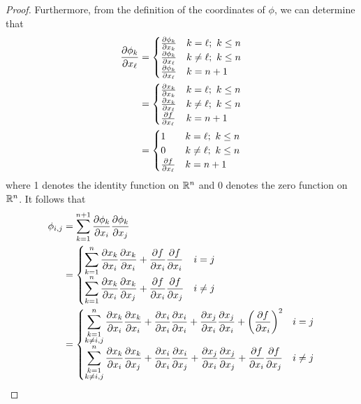 \documentclass[../psets.tex]{subfiles}
\begin{document}
\begin{enumerate}[label={\textbf{4.4.\roman*.}}]
\begin{proof}
        Furthermore, from the definition of the coordinates of $\phi$, we can determine that
        \begin{align*}
            \pdv{\phi_k}{x_\ell} &=
            \begin{cases}
                \pdv{\phi_k}{x_k} & k=\ell;\ k\leq n\\
                \pdv{\phi_k}{x_\ell} & k\neq\ell;\ k\leq n\\
                \pdv{\phi_k}{x_\ell} & k=n+1
            \end{cases}\\
            &=
            \begin{cases}
                \pdv{x_k}{x_k} & k=\ell;\ k\leq n\\
                \pdv{x_k}{x_\ell} & k\neq\ell;\ k\leq n\\
                \pdv{f}{x_\ell} & k=n+1
            \end{cases}\\
            &=
            \begin{cases}
                1 & k=\ell;\ k\leq n\\
                0 & k\neq\ell;\ k\leq n\\
                \pdv{f}{x_\ell} & k=n+1
            \end{cases}
        \end{align*}
        where 1 denotes the identity function on $\mathbb{R}^n$ and 0 denotes the zero function on $\mathbb{R}^n$. It follows that
        \begin{align*}
            \phi_{i,j} &= \sum_{k=1}^{n+1}\pdv{\phi_k}{x_i}\pdv{\phi_k}{x_j}\\
            &=
            \begin{cases}
                \displaystyle\sum_{k=1}^n\pdv{x_k}{x_i}\pdv{x_k}{x_i}+\pdv{f}{x_i}\pdv{f}{x_i} & i=j\\
                \displaystyle\sum_{k=1}^n\pdv{x_k}{x_i}\pdv{x_k}{x_j}+\pdv{f}{x_i}\pdv{f}{x_j} & i\neq j
            \end{cases}\\
            &=
            \begin{cases}
                \displaystyle\sum_{\substack{k=1\\k\neq i,j}}^n\pdv{x_k}{x_i}\pdv{x_k}{x_i}+\pdv{x_i}{x_i}\pdv{x_i}{x_i}+\pdv{x_j}{x_i}\pdv{x_j}{x_i}+\left( \pdv{f}{x_i} \right)^2 & i=j\\
                \displaystyle\sum_{\substack{k=1\\k\neq i,j}}^n\pdv{x_k}{x_i}\pdv{x_k}{x_j}+\pdv{x_i}{x_i}\pdv{x_i}{x_j}+\pdv{x_j}{x_i}\pdv{x_j}{x_j}+\pdv{f}{x_i}\pdv{f}{x_j} & i\neq j

\end{cases}
\end{align*}
\end{proof}
\end{enumerate}
\end{document}
